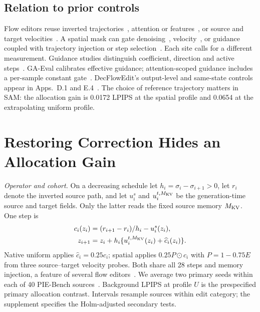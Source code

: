 \documentclass[10pt,doubleanonymous]{ieeeconf}
\begin{document}
\subsection{Relation to prior controls}
Flow editors reuse inverted trajectories~\cite{rout2025rfinversion}, attention or features~\cite{hertz2023prompttoprompt,tumanyan2023pnpfeatures,cao2023masactrl,avrahami2025stableflow}, or source and target velocities~\cite{kulikov2025flowedit,peng2025inversionfree}. A spatial mask can gate denoising~\cite{couairon2023diffedit}, velocity~\cite{li2026veloedit}, or guidance coupled with trajectory injection or step selection~\cite{gong2025instantedit,patel2025flowchef}. Each site calls for a different measurement. Guidance studies distinguish coefficient, direction and active steps~\cite{ho2022cfg,chung2025cfgpp,sadat2025apg,kynkaanniemi2024interval}. GA-Eval calibrates effective guidance; attention-scoped guidance includes a per-sample constant gate~\cite{xie2026guidancematters,li2026asg}. DecFlowEdit's output-level and same-state controls appear in Apps.~D.1 and E.4~\cite{zhan2026decflowedit}. The choice of reference trajectory matters in SAM: the allocation gain is 0.0172 LPIPS at the spatial profile and 0.0654 at the extrapolating uniform profile.

\section{Restoring Correction Hides an Allocation Gain}\label{sec:restoring}
\noindent\textit{Operator and cohort.} On a decreasing schedule let $h_i=\sigma_i-\sigma_{i+1}>0$, let $r_i$ denote the inverted source path, and let $u_i^s$ and $u_i^{t,M_{\rm KV}}$ be the generation-time source and target fields. Only the latter reads the fixed source memory $M_{\rm KV}$. One step is
\begin{align}
c_i(z_i)&=(r_{i+1}-r_i)/h_i-u_i^s(z_i),\nonumber\\
z_{i+1}&=z_i+h_i\{u_i^{t,M_{\rm KV}}(z_i)+\widehat c_i(z_i)\}.
\label{eq:restore}
\end{align}
Native uniform applies $\widehat c_i=0.25c_i$; spatial applies $0.25P\odot c_i$ with $P=1-0.75E$ from three source--target velocity probes. Both share all 28 steps and memory injection, a feature of several flow editors~\cite{wang2025rfsolveredit,deng2025fireflow,zhu2025kvedit}. We average two primary seeds within each of 40 PIE-Bench sources~\cite{ju2024pnpinversion}. Background LPIPS at profile $U$ is the prespecified primary allocation contrast. Intervals resample sources within edit category; the supplement specifies the Holm-adjusted secondary tests.
\end{document}
